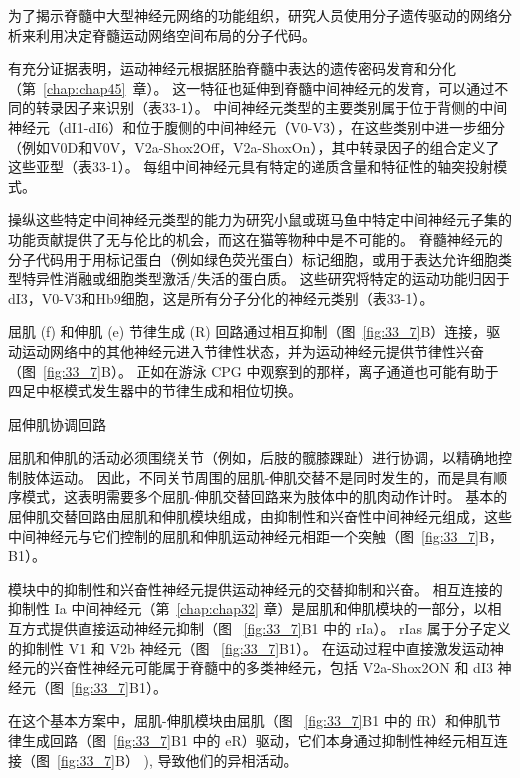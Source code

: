 \begin{proposition} \label{box:33_3}
	
	\quad \quad 为了揭示脊髓中大型神经元网络的功能组织，研究人员使用分子遗传驱动的网络分析来利用决定脊髓运动网络空间布局的分子代码。
	
	\quad \quad 有充分证据表明，运动神经元根据胚胎脊髓中表达的遗传密码发育和分化（第~\ref{chap:chap45}~章）。
	这一特征也延伸到脊髓中间神经元的发育，可以通过不同的转录因子来识别（表33-1）。
	中间神经元类型的主要类别属于位于背侧的中间神经元（dI1-dI6）和位于腹侧的中间神经元（V0-V3），在这些类别中进一步细分（例如V0D和V0V，V2a-Shox2Off，V2a-ShoxOn），其中转录因子的组合定义了这些亚型（表33-1）。
	每组中间神经元具有特定的递质含量和特征性的轴突投射模式。
	
	\quad \quad 操纵这些特定中间神经元类型的能力为研究小鼠或斑马鱼中特定中间神经元子集的功能贡献提供了无与伦比的机会，而这在猫等物种中是不可能的。
	脊髓神经元的分子代码用于用标记蛋白（例如绿色荧光蛋白）标记细胞，或用于表达允许细胞类型特异性消融或细胞类型激活/失活的蛋白质。
	这些研究将特定的运动功能归因于dI3，V0-V3和Hb9细胞，这是所有分子分化的神经元类别（表33-1）。
	
\end{proposition}


屈肌 (f) 和伸肌 (e) 节律生成 (R) 回路通过相互抑制（图~\ref{fig:33_7}B）连接，驱动运动网络中的其他神经元进入节律性状态，并为运动神经元提供节律性兴奋（图~\ref{fig:33_7}B）。
正如在游泳 CPG 中观察到的那样，离子通道也可能有助于四足中枢模式发生器中的节律生成和相位切换。


屈伸肌协调回路

屈肌和伸肌的活动必须围绕关节（例如，后肢的髋膝踝趾）进行协调，以精确地控制肢体运动。
因此，不同关节周围的屈肌-伸肌交替不是同时发生的，而是具有顺序模式，这表明需要多个屈肌-伸肌交替回路来为肢体中的肌肉动作计时。
基本的屈伸肌交替回路由屈肌和伸肌模块组成，由抑制性和兴奋性中间神经元组成，这些中间神经元与它们控制的屈肌和伸肌运动神经元相距一个突触（图~\ref{fig:33_7}B，B1）。


模块中的抑制性和兴奋性神经元提供运动神经元的交替抑制和兴奋。
相互连接的抑制性 Ia 中间神经元（第~\ref{chap:chap32} 章）是屈肌和伸肌模块的一部分，以相互方式提供直接运动神经元抑制（图 ~\ref{fig:33_7}B1 中的 rIa）。
rIas 属于分子定义的抑制性 V1 和 V2b 神经元（图 ~\ref{fig:33_7}B1）。
在运动过程中直接激发运动神经元的兴奋性神经元可能属于脊髓中的多类神经元，包括 V2a-Shox2ON 和 dI3 神经元（图~\ref{fig:33_7}B1）。


在这个基本方案中，屈肌-伸肌模块由屈肌（图 ~\ref{fig:33_7}B1 中的 fR）和伸肌节律生成回路（图~\ref{fig:33_7}B1 中的 eR）驱动，它们本身通过抑制性神经元相互连接（图~\ref{fig:33_7}B） ), 导致他们的异相活动。


